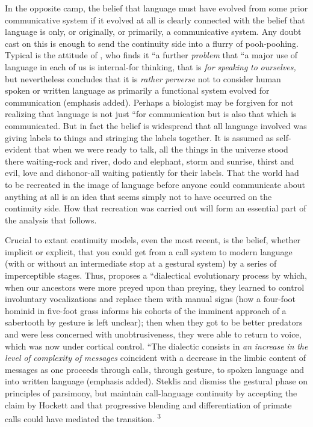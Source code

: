 In the opposite camp, the belief that language must have evolved from some prior communicative system if it evolved at all is clearly connected with the belief that language is only, or originally, or pri\-marily, a communicative system. Any doubt cast on this is enough to send the continuity side into a flurry of pooh-poohing. Typical is the attitude of \citet[175]{Young1978}, who finds it ``a further \textit{problem }that ``a major use of language in each of us is internal-for thinking, that is \textit{for} \textit{speaking} \textit{to} \textit{ourselves,{\textquotedbl}} but nevertheless concludes that it is \textit{{\textquotedbl}rather} \textit{perverse }not to consider human spoken or written language as primarily a functional system evolved for communication (emphasis added). Perhaps a biologist may be forgiven for not realizing that language is not just ``for communication but is also that which is com\-municated. But in fact the belief is widespread that all language in\-volved was giving labels to things and stringing the labels together. It is assumed as self-evident that when we were ready to talk, all the things in the universe stood there waiting-rock and river, dodo and elephant, storm and sunrise, thirst and evil, love and dishonor-all waiting patiently for their labels. That the world had to be recreated in the image of language before anyone could communicate about any\-thing at all is an idea that seems simply not to have occurred on the continuity side. How that recreation was carried out will form an essential part of the analysis that follows.

Crucial to extant continuity models, even the most recent, is
the belief, whether implicit or explicit, that you could get from a call system to modern language (with or without an intermediate stop at a gestural system) by a series of imperceptible stages. Thus, \citet{Stephenson1979} proposes a ``dialectical evolutionary process by which, when our ancestors were more preyed upon than preying, they learned to control involuntary vocalizations and replace them with manual signs (how a four-foot hominid in five-foot grass informs his cohorts of the imminent approach of a sabertooth by gesture is left unclear); then when they got to be better predators and were less concerned with unobtrusiveness, they were able to return to voice, which was now under cortical control. ``The dialectic consists in \textit{an} \textit{increase} \textit{in} \textit{the} \textit{level} \textit{o}\textit{f} \textit{complexity} \textit{of} \textit{messages} coincident with a decrease in the limbic content of messages as one proceeds through calls, through gesture, to spoken language and into written language (emphasis added). Steklis and \citet{Raleigh1979} dismiss the gestural phase on principles of parsimony, but maintain call-language continuity by accepting the claim by Hockett and \citet{Ascher1964} that progressive blending and differentiation of primate calls could have mediated the transition. \textsuperscript{3}

